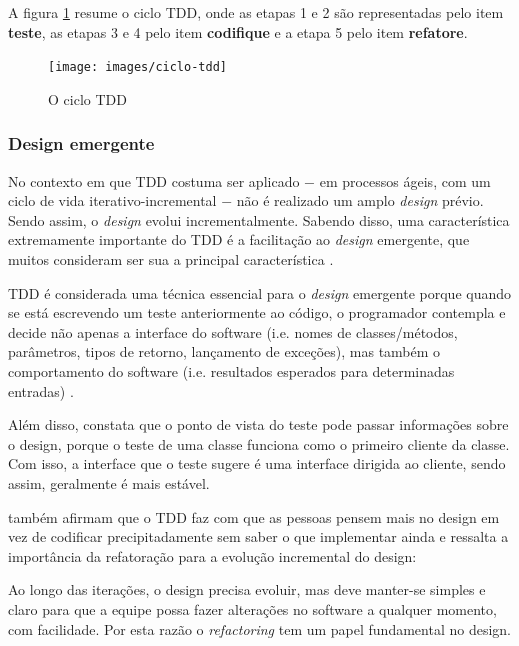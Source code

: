 A figura \ref{img:ciclo-tdd} resume o ciclo TDD, onde as etapas 1 e 2 são representadas pelo item \textbf{teste}, as etapas 3 e 4 pelo item \textbf{codifique} e a etapa 5 pelo item \textbf{refatore}.

\begin{figure}[h]
  \center
  \caption{O ciclo TDD}
  \texttt{[image: images/ciclo-tdd]}
  \label{img:ciclo-tdd}
\end{figure}


\subsubsection{Design emergente}
\label{ssub:design_emergente}

No contexto em que TDD costuma ser aplicado $-$ em processos ágeis, com um ciclo de vida iterativo-incremental $-$ não é realizado um amplo \textit{design} prévio. Sendo assim, o \textit{design} evolui incrementalmente. Sabendo disso, uma característica extremamente importante do TDD é a facilitação ao \textit{design} emergente, que muitos consideram ser sua a principal característica \cite{EmergentDesign}.

TDD é considerada uma técnica essencial para o \textit{design} emergente porque
quando se está escrevendo um teste anteriormente ao código, o programador contempla e decide não apenas a interface do software (i.e. nomes de classes/métodos, parâmetros, tipos de retorno, lançamento de exceções), mas também o comportamento do software (i.e. resultados esperados para determinadas entradas) \cite{JanzenTDD}.

Além disso,  constata que o ponto de vista do teste pode passar informações sobre o design, porque o teste de uma classe funciona como o primeiro cliente da classe. Com isso, a interface que o teste sugere é uma interface dirigida ao cliente, sendo assim, geralmente é mais estável.

 também afirmam que o TDD faz com que as pessoas pensem mais no design em vez de codificar precipitadamente sem saber o que implementar ainda e  ressalta a importância da refatoração para a evolução incremental do design:

\begin{citacao}
Ao longo das iterações, o design precisa evoluir, mas deve manter-se simples e claro para que a equipe possa fazer alterações no software a qualquer momento, com facilidade. Por esta razão o \textit{refactoring} tem um papel fundamental no design.
\end{citacao}


